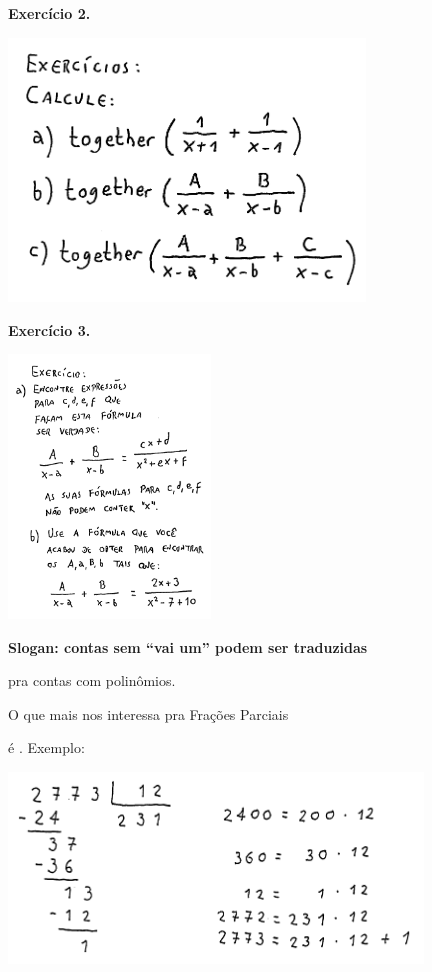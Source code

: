 \documentclass[oneside,12pt]{article}
\begin{document}
\newpage

{\bf Exercício 2.}

\includegraphics[height=7cm]{2020-1-C2/20201112_C2_fracoes_parciais_3.pdf}

\newpage

{\bf Exercício 3.}

\includegraphics[height=7cm]{2020-1-C2/20201112_C2_fracoes_parciais_4.pdf}

\newpage

{\bf Slogan: contas sem ``vai um'' podem ser traduzidas

pra contas com polinômios.}

\ssk

O que mais nos interessa pra Frações Parciais

é . Exemplo:

\includegraphics[width=11cm]{2020-1-C2/20201118_C2_div_com_resto_1.pdf}
\end{document}
